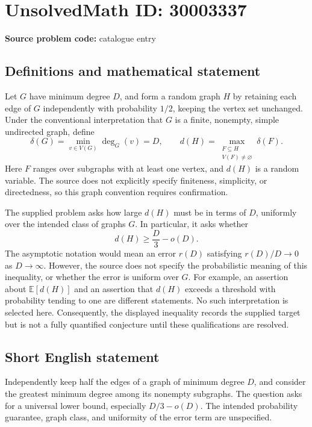 \documentclass[11pt]{article}
\begin{document}
\section*{UnsolvedMath ID: 30003337}
\textbf{Source problem code:} catalogue entry
\subsection{Definitions and mathematical statement}
Let \(G\) have minimum degree \(D\), and form a random graph \(H\) by retaining each edge of \(G\) independently with probability \(1/2\), keeping the vertex set unchanged. Under the conventional interpretation that \(G\) is a finite, nonempty, simple undirected graph, define
\[
\delta(G)=\min_{v\in V(G)}\deg_G(v)=D,
\qquad
d(H)=\max_{\substack{F\subseteq H\\V(F)\ne\varnothing}}\delta(F).
\]
Here \(F\) ranges over subgraphs with at least one vertex, and \(d(H)\) is a random variable. The source does not explicitly specify finiteness, simplicity, or directedness, so this graph convention requires confirmation.

The supplied problem asks how large \(d(H)\) must be in terms of \(D\), uniformly over the intended class of graphs \(G\). In particular, it asks whether
\[
d(H)\geq \frac{D}{3}-o(D).
\]
The asymptotic notation would mean an error \(r(D)\) satisfying \(r(D)/D\to0\) as \(D\to\infty\). However, the source does not specify the probabilistic meaning of this inequality, or whether the error is uniform over \(G\). For example, an assertion about \(\mathbb E[d(H)]\) and an assertion that \(d(H)\) exceeds a threshold with probability tending to one are different statements. No such interpretation is selected here. Consequently, the displayed inequality records the supplied target but is not a fully quantified conjecture until these qualifications are resolved.
\subsection{Short English statement}
Independently keep half the edges of a graph of minimum degree \(D\), and consider the greatest minimum degree among its nonempty subgraphs. The question asks for a universal lower bound, especially \(D/3-o(D)\). The intended probability guarantee, graph class, and uniformity of the error term are unspecified.
\end{document}
